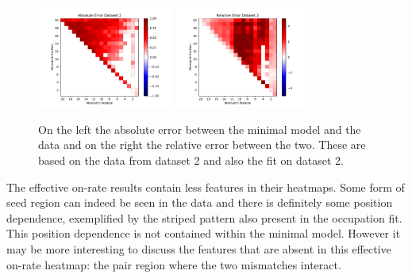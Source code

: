 \begin{figure}
\begin{center}
\includegraphics[width=0.4\textwidth]{images/OnRateFitset2AbsError}
\includegraphics[width=0.4\textwidth]{images/OnRateFitset2RelError}
\caption{On the left the absolute error between the minimal model and the data and on the right the relative error between the two. These are based on the data from dataset 2 and also the fit on dataset 2.}
\label{fig:OnRateHMRep2Errors}
\end{center}
\end{figure}

The effective on-rate results contain less features in their heatmaps. Some form of seed region can indeed be seen in the data and there is definitely some position dependence, exemplified by the striped pattern also present in the occupation fit. This position dependence is not contained within the minimal model. However it may be more interesting to discuss the features that are absent in this effective on-rate heatmap: the pair region where the two mismatches interact.

